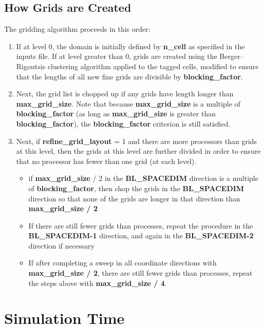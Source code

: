 \subsection{How Grids are Created}
\label{subsec:grid-generation}

\noindent The gridding algorithm proceeds in this order:

\begin{enumerate}
\item If at level 0, the domain is initially defined by {\bf n\_cell}
as specified in the inputs file.  If at level greater than 0,
grids are created using the Berger--Rigoutsis clustering algorithm applied to the
tagged cells, modified to ensure that the lengths of
all new fine grids are divisible by {\bf blocking\_factor}.

\item Next, the grid list is chopped up if any grids have length longer than {\bf max\_grid\_size}.
Note that because {\bf max\_grid\_size} is a multiple of {\bf blocking\_factor}
(as long as {\bf max\_grid\_size} is greater than {\bf blocking\_factor}),
the {\bf blocking\_factor} criterion is still satisfied.

\item Next, if {\bf refine\_grid\_layout} = 1 and there are more processors than grids
at this level, then the grids at this level are further divided in order to ensure that
no processor has fewer than one grid (at each level).

\begin{itemize}
\item if {\bf max\_grid\_size} / 2 in the {\bf BL\_SPACEDIM} direction is a multiple of
{\bf blocking\_factor}, then chop the grids in the {\bf BL\_SPACEDIM} direction
so that none of the grids are longer in that direction than {\bf max\_grid\_size / 2}
\item If there are still fewer grids than processes, repeat the procedure in the
{\bf BL\_SPACEDIM-1} direction, and again in the {\bf BL\_SPACEDIM-2} direction if necessary
\item If after completing a sweep in all coordinate directions with  {\bf max\_grid\_size / 2},
there are still fewer grids than processes, repeat the steps above with  {\bf max\_grid\_size / 4}.
\end{itemize}

\end{enumerate}

\section{Simulation Time}

